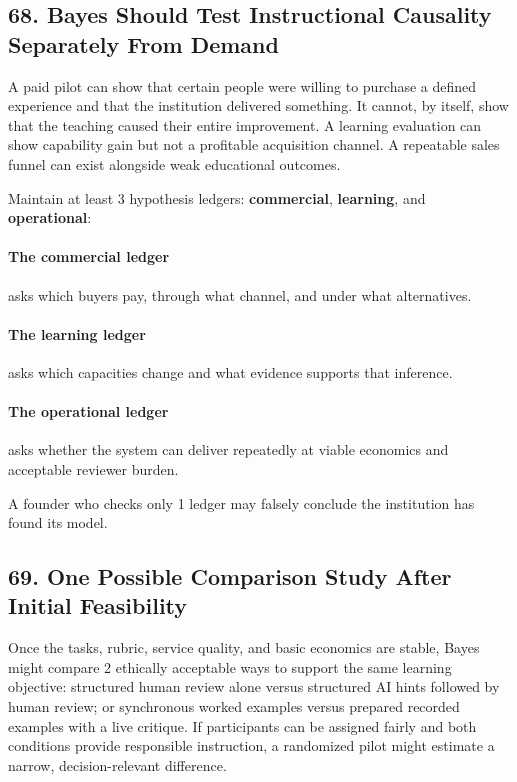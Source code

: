 \subsection*{68. Bayes Should Test Instructional Causality Separately From Demand}

A paid pilot can show that certain people were willing to purchase a defined experience and that the institution delivered something. It cannot, by itself, show that the teaching caused their entire improvement. A learning evaluation can show capability gain but not a profitable acquisition channel. A repeatable sales funnel can exist alongside weak educational outcomes.

Maintain at least 3 hypothesis ledgers: \textbf{commercial}, \textbf{learning}, and \textbf{operational}:

\paragraph*{The commercial ledger} asks which buyers pay, through what channel, and under what alternatives.

\paragraph*{The learning ledger} asks which capacities change and what evidence supports that inference.

\paragraph*{The operational ledger} asks whether the system can deliver repeatedly at viable economics and acceptable reviewer burden.

A founder who checks only 1 ledger may falsely conclude the institution has found its model.

\subsection*{69. One Possible Comparison Study After Initial Feasibility}

Once the tasks, rubric, service quality, and basic economics are stable, Bayes might compare 2 ethically acceptable ways to support the same learning objective: structured human review alone versus structured AI hints followed by human review; or synchronous worked examples versus prepared recorded examples with a live critique. If participants can be assigned fairly and both conditions provide responsible instruction, a randomized pilot might estimate a narrow, decision-relevant difference.

